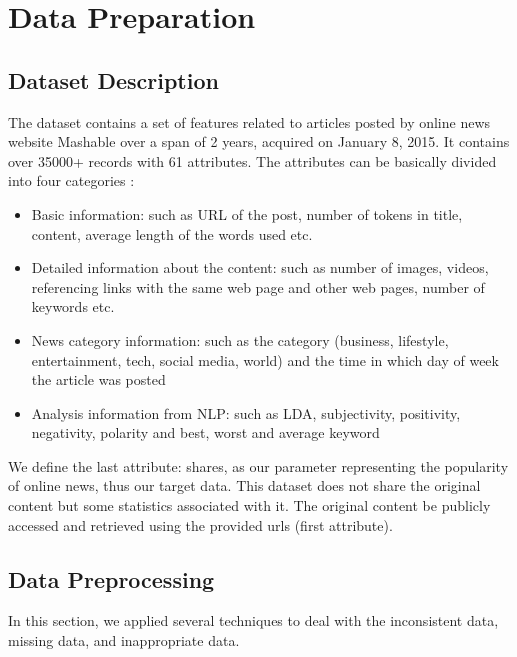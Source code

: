 \documentclass[letterpaper,12pt]{article}
\begin{document}
\section{Data Preparation}
\subsection{Dataset Description}
The dataset contains a set of features related to articles posted by online news website Mashable over a span of 2 years, acquired on January 8, 2015. It contains over 35000+ records with 61 attributes. The attributes can be basically divided into four categories \cite{a1}:
\begin{itemize}
    \item Basic information: such as URL of the post, number of tokens in title, content, average length of the words used etc.
    \item Detailed information about the content: such as number of images, videos, referencing links with the same web page and other web pages, number of keywords etc.
    \item  News category information: such as the category (business, lifestyle, entertainment, tech, social media, world) and the time in which day of week the article was posted 
    \item Analysis information from NLP: such as LDA, subjectivity, positivity, negativity, polarity and best, worst and average keyword
\end{itemize}
We define the last attribute: shares, as our parameter representing the popularity of online news, thus our target data. This dataset does not share the original content but some statistics associated with it. The original content be publicly accessed and retrieved using the provided urls (first attribute).

\subsection{Data Preprocessing}
In this section, we applied several techniques to deal with the inconsistent data, missing data, and inappropriate data. 
\end{document}
